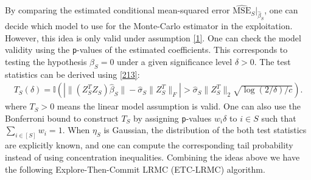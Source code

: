\documentclass[11pt,a4paper]{amsart}
\numberwithin{equation}{section}
\theoremstyle{plain}
\theoremstyle{definition}
\def\P{{\mathbb P}}
\def\mse{{\text{MSE}}}
\begin{document}
By comparing the estimated conditional mean-squared error $\widehat{\mse}_S|_{\widehat{\beta}_S}$, one can decide which model to use for the Monte-Carlo estimator in the exploitation. 
However, this idea is only valid under assumption \eqref{1}. 
One can check the model validity using the \texttt{p}-values of the estimated coefficients. 
This corresponds to testing the hypothesis $\beta_S=0$ under a given significance level $\delta>0$.  
The test statistics can be derived using \eqref{213}:
\begin{align}
T_{S}(\delta) = \mathbb I\left(\left|\|(Z_S^TZ_S)\widehat{\beta}_S\| -\widehat{\sigma}_S\|Z^T_S\|_F\right|>\widehat{\sigma}_S \|Z^T_S\|_2\sqrt{\log(2/\delta)/c}\right).
\end{align}
where $T_S>0$ means the linear model assumption is valid.
One can also use the Bonferroni bound to construct $T_S$ by assigning \texttt{p}-values $w_i\delta$ to $i\in S$ such that $\sum_{i\in [S]}w_i = 1$. 
When $\eta_S$ is Gaussian, the distribution of the both test statistics are explicitly known, and one can compute the corresponding tail probability instead of using concentration inequalities. 
Combining the ideas above we have the following Explore-Then-Commit LRMC (ETC-LRMC) algorithm.
\end{document}
